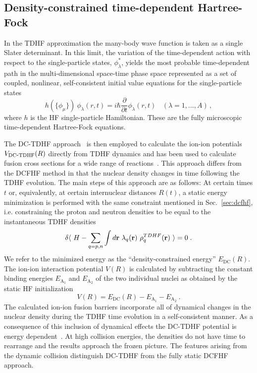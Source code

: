 \subsection{Density-constrained time-dependent Hartree-Fock}
\label{sec:dctdhf}


In the TDHF approximation the many-body wave function is taken as a single
Slater determinant.
In this limit, the variation of the time-dependent action with respect to the single-particle states, $\phi^{*}_{\lambda}$, yields the most probable time-dependent path
in the multi-dimensional space-time phase space represented as a
set of coupled, nonlinear, self-consistent initial value equations
for the single-particle states
\begin{equation}
h(\{\phi_{\mu}\}) \ \phi_{\lambda} (r,t) = i \hbar \frac{\partial}{\partial t} \phi_{\lambda} (r,t)
\ \ \ \ (\lambda = 1,...,A)\,,
\end{equation}
where $h$ is the HF single-particle Hamiltonian.
These are the fully microscopic time-dependent Hartree-Fock equations.

The DC-TDHF approach~\protect\citep{umar2006b} is then employed to calculate the ion-ion potentials $V_{\mathrm{DC{\hbox{-}}TDHF}}(R)$ directly from TDHF dynamics and has been used to calculate fusion cross sections for a wide range of
reactions~\protect\citep{godbey2017,umar2014a,simenel2013a,umar2012a,umar2006a,oberacker2010,umar2009a,jiang2015a}.
This approach differs from the DCFHF method in that the nuclear density changes in time following the
TDHF evolution.
The main steps of this approach are as follows:
At certain times $t$ or, equivalently, at certain internuclear distances
$R(t)$, a static energy minimization is performed with the same constraint mentioned in Sec.~\ref{sec:dcfhf}, i.e. constraining the proton and neutron densities to be equal to the instantaneous TDHF densities
\begin{equation}
\delta \< \ H - \sum_{q=p,n}\int d\vr \ \lambda_q(\vr) \ \rho^{TDHF}_q(\vr) \ \> = 0\;.
\label{eq:var_dens}
\end{equation}
We refer to the minimized energy as the ``density-constrained energy''
$E_{\mathrm{DC}}(R)$.
The ion-ion interaction potential $V(R)$ is calculated by
subtracting the constant binding energies
$E_{\mathrm{A_{1}}}$ and $E_{\mathrm{A_{2}}}$ of the two individual nuclei as obtained by the static HF initialization
\begin{equation}
V(R)=E_{\mathrm{DC}}(R)-E_{\mathrm{A_{1}}}-E_{\mathrm{A_{2}}}\ .
\label{eq:dctdhfvr}
\end{equation}
The calculated ion-ion fusion barriers incorporate all of dynamical changes in the nuclear density during the TDHF time evolution in a self-consistent manner.
As a consequence of this inclusion of dynamical effects the DC-TDHF potential is energy dependent~\protect\citep{umar2014a}.
At high collision energies, the densities do not have time to rearrange and the results approach the frozen picture.
The features arising from the dynamic collision distinguish DC-TDHF from the fully static DCFHF approach.

